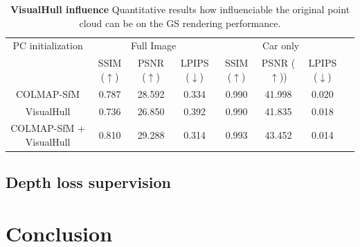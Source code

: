 \begin{table}[htp!]
  \caption{\textbf{VisualHull influence} Quantitative results how influenciable the original point cloud can be on the GS rendering performance.}
  \label{table:gs-vh-influence}
  \centering%
  \begin{adjustbox}{width=\linewidth}
  \begin{tabular}[h]{c||ccccccc}
  \hline
   PC initialization & \multicolumn{3}{c}{Full Image} & \multicolumn{3}{c}{Car only} \\
   &  SSIM ($\uparrow$) & PSNR ($\uparrow$) & LPIPS ($\downarrow$) & SSIM ($\uparrow$) & PSNR ($\uparrow$)) & LPIPS ($\downarrow$)\\
  \hline
  COLMAP-SfM  & 0.787  & 28.592 & 0.334 & 0.990 & 41.998 & 0.020 \\
  VisualHull & 0.736 & 26.850 & 0.392 & 0.990 & 41.835  & 0.018 \\
  COLMAP-SfM + VisualHull & \cellcolor{red!25}0.810 & \cellcolor{red!25}29.288 & \cellcolor{red!25}0.314 & \cellcolor{red!25}0.993 & \cellcolor{red!25}43.452  & \cellcolor{red!25}0.014 \\
  \hline 
  \end{tabular}
  \end{adjustbox}
  \end{table}


  
\subsection{Depth loss supervision}

\section{Conclusion}

